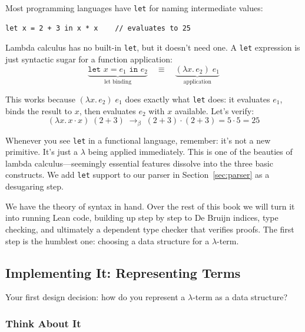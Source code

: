 \documentclass[11pt,a4paper]{article}
\theoremstyle{definition}
\newcommand{\lam}{\lambda}
\newcommand{\reduce}{\longrightarrow_\beta}
\begin{document}
Most programming languages have \texttt{let} for naming intermediate values:
\begin{verbatim}
let x = 2 + 3 in x * x    // evaluates to 25
\end{verbatim}

Lambda calculus has no built-in \texttt{let}, but it doesn't need one.
A \texttt{let} expression is just syntactic sugar for a function application:
\[
  \underbrace{\texttt{let } x = e_1 \texttt{ in } e_2}
  _{\text{let binding}}
  \quad\equiv\quad
  \underbrace{(\lam x.\, e_2)\; e_1}
  _{\text{application}}
\]

This works because $(\lam x.\, e_2)\; e_1$ does exactly what \texttt{let} does:
it evaluates $e_1$, binds the result to $x$, then evaluates $e_2$ with $x$
available. Let's verify:
\[
  (\lam x.\, x \cdot x)\;(2 + 3) \;\reduce\; (2 + 3) \cdot (2 + 3) = 5 \cdot 5 = 25
\]

\begin{intuition}
Whenever you see \texttt{let} in a functional language, remember: it's not a
new primitive. It's just a $\lam$ being applied immediately. This is one of the
beauties of lambda calculus---seemingly essential features dissolve into the
three basic constructs. We add \texttt{let} support to our parser in
Section~\ref{sec:parser} as a desugaring step.
\end{intuition}


We have the theory of syntax in hand. Over the rest of this book we will turn
it into running Lean code, building up step by step to De Bruijn indices, type
checking, and ultimately a dependent type checker that verifies proofs. The
first step is the humblest one: choosing a data structure for a $\lam$-term.

\subsection{Implementing It: Representing Terms}\label{sec:namedimpl}

Your first design decision: how do you represent a $\lam$-term as a data
structure?

\subsubsection{Think About It}
\end{document}
